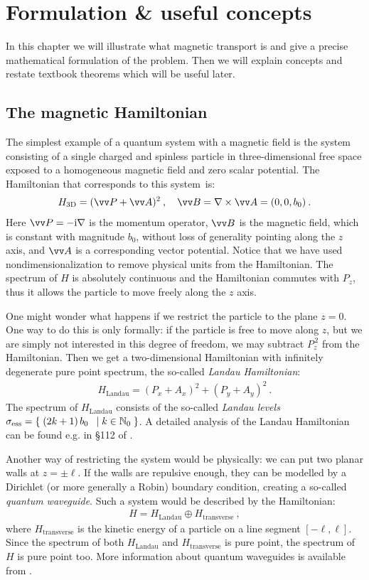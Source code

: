 \chapter{Formulation \& useful concepts}
In this chapter we will illustrate what magnetic transport is and give a precise mathematical formulation of the problem. Then we will explain concepts and restate textbook theorems which will be useful later.

\section{The magnetic Hamiltonian}
The simplest example of a quantum system with a magnetic field is the system consisting of a single charged and spinless particle in three-dimensional free space exposed to a homogeneous magnetic field and zero scalar potential. The Hamiltonian that corresponds to this system~is:
\begin{align*}
    H_\mathrm{3D} = (\vv P + \vv A)^2 \: , \quad
    \vv B = \nabla \times \vv A = (0, 0, b_0) \: .
\end{align*}
Here $\vv P = -\i \nabla$ is the momentum operator, $\vv B$ is the magnetic field, which is constant with magnitude $b_0$, without loss of generality pointing along the $z$ axis, and $\vv A$ is a corresponding vector potential. Notice that we have used nondimensionalization to remove physical units from the Hamiltonian. The spectrum of $H$ is absolutely continuous and the Hamiltonian commutes with $P_z$, thus it allows the particle to move freely along the $z$ axis.

One might wonder what happens if we restrict the particle to the plane $z=0$. One way to do this is only formally: if the particle is free to move along $z$, but we are simply not interested in this degree of freedom, we may subtract $P_z^{\,2}$ from the Hamiltonian. Then we get a two-dimensional Hamiltonian with infinitely degenerate pure point spectrum, the so-called \textit{Landau Hamiltonian}:
\begin{align*}
    H_\mathrm{Landau} = (P_x + A_x)^2 + (P_y + A_y)^2 \: .
\end{align*}
The spectrum of $H_\mathrm{Landau}$ consists of the so-called \textit{Landau levels} $\sigma_{\mathrm{ess}} = \{ \; {(2k + 1) \, b_0} $ $\;|\; k \in \mathbb{N}_0 \; \}$. A detailed analysis of the Landau Hamiltonian can be found e.g. in §112 of \cite{LandauLifshitz3}.

Another way of restricting the system would be physically: we can put two planar walls at $z=\pm\ell$. If the walls are repulsive enough, they can be modelled by a Dirichlet (or more generally a Robin) boundary condition, creating a so-called \textit{quantum waveguide}. Such a system would be described by the Hamiltonian:
\begin{align*}
    H = H_\mathrm{Landau} \oplus H_\mathrm{transverse} \: ,
\end{align*}
where $H_\mathrm{transverse}$ is the kinetic energy of a particle on a line segment $[ -\ell, \ell ]$. Since the spectrum of both $H_\mathrm{Landau}$ and $H_\mathrm{transverse}$ is pure point, the spectrum of $H$ is pure point too. More information about quantum waveguides is available from \cite{ExnerKovarik2015}.

